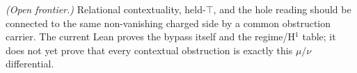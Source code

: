 \begin{theorem}\label{thm:contextual-obstruction-differential-bypass}\notready{}
\emph{(Open frontier.)} Relational contextuality, held-\(\top\), and the
hole reading should be connected to the same non-vanishing charged side by
a common obstruction carrier.  The current Lean proves the bypass itself and
the regime/H\(^1\) table; it does not yet prove that every contextual
obstruction is exactly this \(\mu/\nu\) differential.
\end{theorem}
